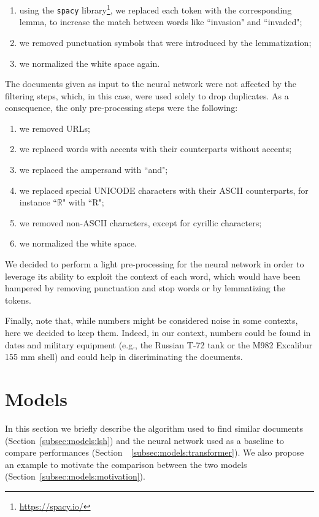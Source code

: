 \documentclass[runningheads]{llncs}
\begin{document}
\begin{enumerate}
  \item using the \texttt{spacy} library\footnote{\url{https://spacy.io/}}, we replaced each token with the corresponding lemma, to increase the match between words like “invasion" and “invaded";
  \item we removed punctuation symbols that were introduced by the lemmatization;
  \item we normalized the white space again.
\end{enumerate}

The documents given as input to the neural network were not affected by the filtering steps, which, in this case, were used solely to drop duplicates. As a consequence, the only pre-processing steps were the following:

\begin{enumerate}
  \item we removed URLs;
  \item we replaced words with accents with their counterparts without accents;
  \item we replaced the ampersand with “and";
  \item we replaced special UNICODE characters with their ASCII counterparts, for instance “$\mathbb{R}$" with “R";
  \item we removed non-ASCII characters, except for cyrillic characters;
  \item we normalized the white space.
\end{enumerate}

We decided to perform a light pre-processing for the neural network in order to leverage its ability to exploit the context of each word, which would have been hampered by removing punctuation and stop words or by lemmatizing the tokens.

Finally, note that, while numbers might be considered noise in some contexts, here we decided to keep them. Indeed, in our context, numbers could be found in dates and military equipment (e.g., the Russian T-72 tank or the M982 Excalibur 155 mm shell) and could help in discriminating the documents.

\section{Models}
\label{sec:models}

In this section we briefly describe the algorithm used to find similar documents (Section~\ref{subsec:models:lsh}) and the neural network used as a baseline to compare performances (Section~~\ref{subsec:models:transformer}). We also propose an example to motivate the comparison between the two models (Section~\ref{subsec:models:motivation}).
\end{document}
